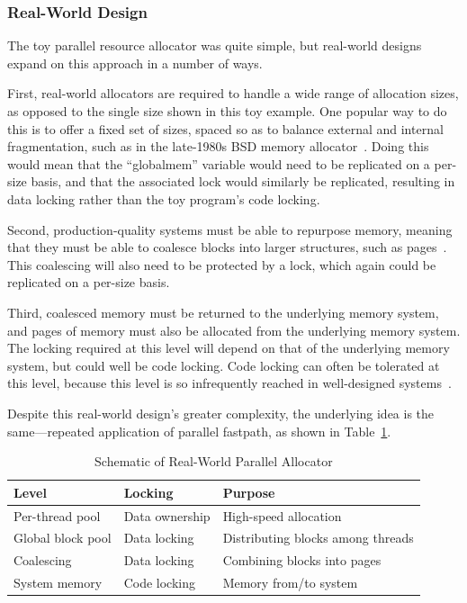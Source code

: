\subsubsection{Real-World Design}

The toy parallel resource allocator was quite simple, but real-world
designs expand on this approach in a number of ways.

First, real-world allocators are required to handle a wide range
of allocation sizes, as opposed to the single size shown in this
toy example.
One popular way to do this is to offer a fixed set of sizes, spaced
so as to balance external and internal fragmentation, such as in
the late-1980s BSD memory allocator~\cite{McKusick88}.
Doing this would mean that the ``globalmem'' variable would need
to be replicated on a per-size basis, and that the associated
lock would similarly be replicated, resulting in data locking
rather than the toy program's code locking.

Second, production-quality systems must be able to repurpose memory,
meaning that they must be able to coalesce blocks into larger structures,
such as pages~\cite{McKenney93}.
This coalescing will also need to be protected by a lock, which again
could be replicated on a per-size basis.

Third, coalesced memory must be returned to the underlying memory
system, and pages of memory must also be allocated from the underlying
memory system.
The locking required at this level will depend on that of the underlying
memory system, but could well be code locking.
Code locking can often be tolerated at this level, because this
level is so infrequently reached in well-designed systems~\cite{McKenney01e}.

Despite this real-world design's greater complexity, the underlying
idea is the same---repeated application of parallel fastpath,
as shown in
Table~\ref{fig:app:questions:Schematic of Real-World Parallel Allocator}.

\begin{table}[tbp]
\small
\centering
\renewcommand*{\arraystretch}{1.25}
\begin{tabularx}{\twocolumnwidth}{ll>{\raggedright\arraybackslash}X}
\toprule
Level	& Locking & Purpose \\
\midrule
Per-thread pool	  & Data ownership & High-speed allocation \\
Global block pool & Data locking   & Distributing blocks among threads \\
Coalescing	  & Data locking   & Combining blocks into pages \\
System memory	  & Code locking   & Memory from/to system \\
\bottomrule
\end{tabularx}
\caption{Schematic of Real-World Parallel Allocator}
\label{fig:app:questions:Schematic of Real-World Parallel Allocator}
\end{table}




